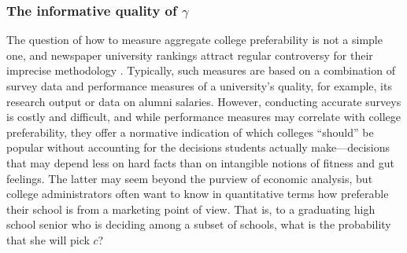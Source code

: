 \documentclass[12pt]{article}
\theoremstyle{definition}
\begin{document}
\subsubsection{The informative quality of $\gamma$}
The question of how to measure aggregate college preferability is not a simple one, and newspaper university rankings attract regular controversy for their imprecise methodology \parencite[][]{intlrankingsandconflicts}. Typically, such measures are based on a combination of survey data and performance measures of a university's quality, for example, its research output or data on alumni salaries. However, conducting accurate surveys is costly and difficult, and while performance measures may correlate with college preferability, they offer a normative indication of which colleges ``should'' be popular without accounting for the decisions students actually make---decisions that may depend less on hard facts than on intangible notions of fitness and gut feelings. The latter may seem beyond the purview of economic analysis, but college administrators often want to know in quantitative terms how preferable their school is from a marketing point of view. That is, to a graduating high school senior who is deciding among a subset of schools, what is the probability that she will pick $c$?
\end{document}

